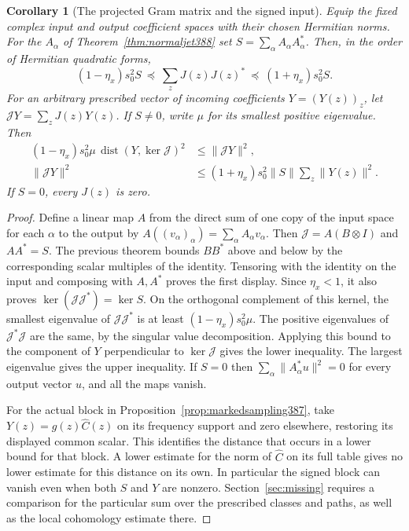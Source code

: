 \documentclass[a4paper,11pt]{article}
\newtheorem{corollary}[proposition]{Corollary}
\theoremstyle{definition}
\theoremstyle{remark}
\numberwithin{equation}{section}
\begin{document}
\begin{corollary}[The projected Gram matrix and the signed input]
\label{cor:weightedkernel389}
Equip the fixed complex input and output coefficient spaces with
their chosen Hermitian norms. For the \(A_\alpha\) of
Theorem~\ref{thm:normaljet388} set \(S=\sum_\alpha A_\alpha A_\alpha^*\).
Then, in the order of Hermitian quadratic forms,
\[
 (1-\eta_x)s_0^2S\ \preceq\ \sum_z J(z)J(z)^*
                           \ \preceq\ (1+\eta_x)s_0^2S .
\]
For an arbitrary prescribed vector of incoming coefficients
\(Y=(Y(z))_z\), let \(\mathcal JY=\sum_zJ(z)Y(z)\).
If \(S\ne0\), write \(\mu\) for its smallest positive eigenvalue.
Then
\begin{align*}
  (1-\eta_x)s_0^2\mu\,\operatorname{dist}(Y,\ker\mathcal J)^2
    &\le \|\mathcal JY\|^2,\\
  \|\mathcal JY\|^2
    &\le (1+\eta_x)s_0^2\|S\|\sum_z\|Y(z)\|^2 .
\end{align*}
If \(S=0\), every \(J(z)\) is zero.
\end{corollary}
\begin{proof}
Define a linear map \(A\) from the direct sum of one copy of the
input space for each \(\alpha\) to the output by
\(A((v_\alpha)_\alpha)=\sum_\alpha A_\alpha v_\alpha\).
Then \(\mathcal J=A(B\otimes I)\) and \(AA^*=S\).
The previous theorem bounds \(BB^*\) above and below by the
corresponding scalar multiples of the identity. Tensoring with
the identity on the input and composing with \(A,A^*\) proves
the first display. Since \(\eta_x<1\), it also proves
\(\ker(\mathcal J\mathcal J^*)=\ker S\).
On the orthogonal complement of this kernel, the smallest
eigenvalue of \(\mathcal J\mathcal J^*\) is at least
\((1-\eta_x)s_0^2\mu\). The positive eigenvalues of
\(\mathcal J^*\mathcal J\) are the same, by the singular value
decomposition. Applying this bound to the component of \(Y\)
perpendicular to \(\ker\mathcal J\) gives the lower inequality.
The largest eigenvalue gives the upper inequality. If \(S=0\)
then \(\sum_\alpha\|A_\alpha^*u\|^2=0\) for every output vector
\(u\), and all the maps vanish.

For the actual block in Proposition~\ref{prop:markedsampling387},
take \(Y(z)=g(z)\widehat C(z)\) on its frequency support and
zero elsewhere, restoring its displayed common scalar. This
identifies the distance that occurs in a lower bound for that
block. A lower estimate for the norm of \(\widehat C\) on its
full table gives no lower estimate for this distance on its own.
In particular the signed block can vanish even when both
\(S\) and \(Y\) are nonzero. Section~\ref{sec:missing} requires a
comparison for the particular sum over the prescribed classes
and paths, as well as the local cohomology estimate there.
\end{proof}
\end{document}
